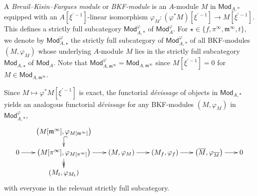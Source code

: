 \documentclass[11pt]{article}
\theoremstyle{definition}
\numberwithin{equation}{section}
\numberwithin{figure}{section}
\numberwithin{table}{section}
\newcommand{\Mod}{\mathsf{Mod}}
\begin{document}
\subsubsection{}\label{subsec:DefBKFMod}

A \emph{Breuil--Kisin--Fargues module} or \emph{BKF-module} is an $A$-module $M$ in $\Mod_{A,\ast}$ equipped with an $A[\xi^{\prime-1}]$-linear isomorphism $\varphi_{M}:(\varphi^{\ast}M)[\xi^{\prime-1}]\rightarrow M[\xi^{\prime-1}]$. This defines a strictly full subcategory $\Mod_{A,\ast}^{\varphi}$ of $\Mod_{A}^{\varphi}$. For $\star\in\{f,\pi^{\infty},\mathfrak{m}^{\infty},t\}$, we denote by $\Mod_{A,\star}^{\varphi}$ the strictly full subcategory of $\Mod_{A,\ast}^{\varphi}$ of all BKF-modules $(M,\varphi_{M})$ whose underlying $A$-module $M$ lies in the strictly full subcategory $\Mod_{A,\star}$ of $\Mod_{A}$. Note that $\Mod_{A,\mathfrak{m}^{\infty}}^{\varphi}=\Mod_{A,\mathfrak{m}^{\infty}}$ since $M[\xi^{\prime-1}]=0$ for $M\in\Mod_{A,\mathfrak{m}^{\infty}}$.

Since $M\mapsto\varphi^{\ast}M[\xi^{\prime-1}]$ is exact, the functorial
\emph{d\'evissage} of objects in $\Mod_{A,\ast}$ yields an analogous functorial
\emph{d\'evissage} for any BKF-modules $(M,\varphi_{M})$ in $\Mod_{A,\ast}^{\varphi}$,\emph{
\[
\xymatrix@R=1pc@C=1.5pc{ & \left(M[\mathfrak{m}^{\infty}],\varphi_{M[\mathfrak{m}^{\infty}]}\right)\ar@{^{(}->}[d]\\
0\ar[r] & \left(M[\pi^{\infty}],\varphi_{M[\pi^{\infty}]}\right)\ar[r]\ar@{->>}[d] & \left(M,\varphi_{M}\right)\ar[r] & \left(M_{f},\varphi_{f}\right)\ar[r] & \left(\overline{M},\varphi_{\overline{M}}\right)\ar[r] & 0\\
& \left(M_{t},\varphi_{M_{t}}\right) }
\]
}with everyone in the relevant strictly full subcategory.

\subsubsection{}
\end{document}
